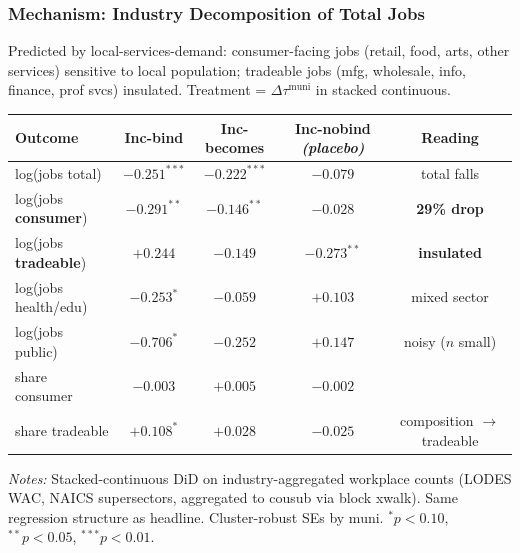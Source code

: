 \documentclass[xcolor = x11names, compress, aspectratio = 169]{beamer}
\begin{document}
    \begin{frame}
    \frametitle{Mechanism: Industry Decomposition of Total Jobs}
        \footnotesize
        Predicted by local-services-demand: consumer-facing jobs (retail,
        food, arts, other services) sensitive to local population; tradeable
        jobs (mfg, wholesale, info, finance, prof svcs) insulated.
        Treatment = $\Delta\tau^{\text{muni}}$ in stacked continuous.
        \medskip
        \scriptsize
        \renewcommand{\arraystretch}{1.15}
        \setlength{\tabcolsep}{6pt}
        \begin{tabular}{lcccc}
            \toprule
            Outcome & Inc-bind & Inc-becomes & Inc-nobind \emph{(placebo)} & Reading \\
            \midrule
            log(jobs total)       & $\bm{-0.251^{***}}$ & $\bm{-0.222^{***}}$ & $-0.079$    & total falls \\
            log(jobs \textbf{consumer})    & $\bm{-0.291^{**}}$  & $\bm{-0.146^{**}}$  & $-0.028$    & \textcolor{GopherMaroon}{\textbf{29\% drop}} \\
            log(jobs \textbf{tradeable})   & $+0.244$            & $-0.149$            & $-0.273^{**}$ & \textcolor{GopherMaroon}{\textbf{insulated}} \\
            log(jobs health/edu)  & $-0.253^{*}$        & $-0.059$            & $+0.103$    & mixed sector \\
            log(jobs public)      & $-0.706^{*}$        & $-0.252$            & $+0.147$    & noisy ($n$ small) \\
            \midrule
            share consumer        & $-0.003$            & $+0.005$            & $-0.002$    & \\
            share tradeable       & $\bm{+0.108^{*}}$   & $+0.028$            & $-0.025$    & composition $\to$ tradeable \\
            \bottomrule
        \end{tabular}
        \vspace{0.10cm}
        \begin{minipage}{0.95\textwidth}
            \tiny \textit{Notes:} Stacked-continuous DiD on industry-aggregated
            workplace counts (LODES WAC, NAICS supersectors, aggregated to cousub
            via block xwalk). Same regression structure as headline.
            Cluster-robust SEs by muni.
            $^{*}p<0.10$, $^{**}p<0.05$, $^{***}p<0.01$.
        \end{minipage}
    \end{frame}
\end{document}
